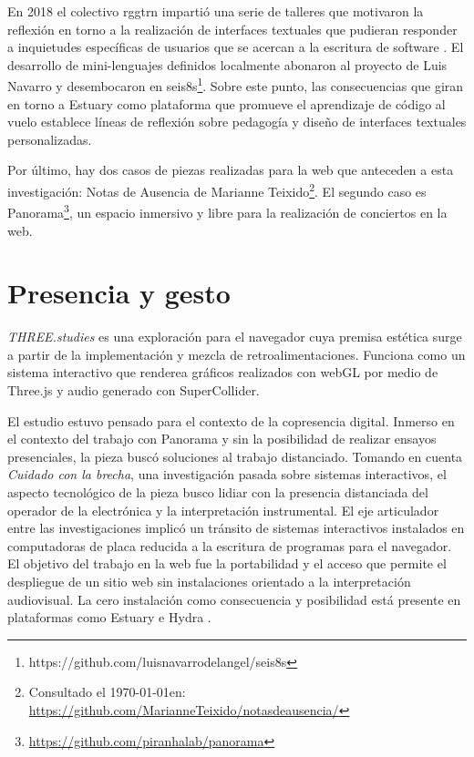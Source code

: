 \documentclass[12pt,letterpaper, twoside, openright,
headinclude,footinclude,BCOR5mm,
numbers=noenddot,cleardoublepage=empty,
tablecaptionabove]{article}
\begin{document}
En 2018 el colectivo rggtrn impartió una serie de talleres que motivaron la reflexión en torno a la realización de interfaces textuales que pudieran responder a inquietudes específicas de usuarios que se acercan a la escritura de software \citep{bellacode}. El desarrollo de mini-lenguajes definidos localmente abonaron al proyecto de Luis Navarro y desembocaron en seis8s\footnote{https://github.com/luisnavarrodelangel/seis8s}. Sobre este punto, las consecuencias que giran en torno a Estuary como plataforma que promueve el aprendizaje de código al vuelo establece líneas de reflexión sobre pedagogía y diseño de interfaces textuales personalizadas.


Por último, hay dos casos de piezas realizadas para la web que anteceden a esta investigación: Notas de Ausencia de Marianne Teixido\footnote{Consultado el \today en: \url{https://github.com/MarianneTeixido/notasdeausencia/}}. El segundo caso es Panorama\footnote{\url{https://github.com/piranhalab/panorama}}, un espacio inmersivo y libre para la realización de conciertos en la web.



\section*{Presencia y gesto}

\emph{THREE.studies} es una exploración para el navegador cuya premisa estética surge a partir de la implementación y mezcla de retroalimentaciones. Funciona como un sistema interactivo que renderea gráficos realizados con webGL por medio de Three.js y audio generado con SuperCollider.
 


El estudio estuvo pensado para el contexto de la copresencia digital. Inmerso en el contexto del trabajo con Panorama y sin la posibilidad de realizar ensayos presenciales, la pieza buscó soluciones al trabajo distanciado. Tomando en cuenta \emph{Cuidado con la brecha}, una investigación pasada sobre sistemas interactivos, el aspecto tecnológico de la pieza busco lidiar con la presencia distanciada del operador de la electrónica y  la interpretación instrumental. El eje articulador entre las investigaciones implicó un tránsito de sistemas interactivos instalados en computadoras de placa reducida a la escritura de programas para el navegador. El objetivo del trabajo en la web fue la portabilidad y el acceso que permite el despliegue de un sitio web sin instalaciones orientado a la interpretación audiovisual. La cero instalación como consecuencia y posibilidad está presente en plataformas como Estuary \citep{ogborn} e Hydra \citep{ojack}. %
\end{document}
